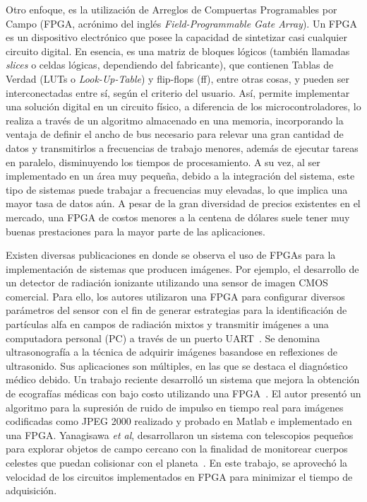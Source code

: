 Otro enfoque, es la utilización de Arreglos de Compuertas Programables por Campo (FPGA, acrónimo del inglés {\it Field-Programmable Gate Array}). Un FPGA es un dispositivo electrónico que posee la capacidad de sintetizar casi cualquier circuito digital. En esencia, es una matriz de bloques lógicos (también llamadas {\it slices} o celdas lógicas, dependiendo del fabricante), que contienen Tablas de Verdad (LUTs o {\it Look-Up-Table}) y flip-flops (ff), entre otras cosas, y pueden ser interconectadas entre sí, según el criterio del usuario. Así, permite implementar una solución digital en un circuito físico, a diferencia de los microcontroladores, lo realiza a través de un algoritmo almacenado en una memoria, incorporando la ventaja de definir el ancho de bus necesario para relevar una gran cantidad de datos y transmitirlos a frecuencias de trabajo menores, además de ejecutar tareas en paralelo, disminuyendo los tiempos de procesamiento. A su vez, al ser implementado en un área muy pequeña, debido a la integración del sistema, este tipo de sistemas puede trabajar a frecuencias muy elevadas, lo que implica una mayor tasa de datos aún. A pesar de la gran diversidad de precios existentes en el mercado, una FPGA de costos menores a la centena de dólares suele tener muy buenas prestaciones para la mayor parte de las aplicaciones.%

Existen diversas publicaciones en donde se observa el uso de FPGAs para la implementación de sistemas que producen imágenes. Por ejemplo, el desarrollo de un detector de radiación ionizante utilizando una sensor de imagen CMOS comercial. Para ello, los autores utilizaron una FPGA para configurar diversos parámetros del sensor con el fin de generar estrategias para la identificación de partículas alfa en campos de radiación mixtos y transmitir imágenes a una computadora personal (PC) a través de un puerto UART~\cite{Perez2017}. Se denomina ultrasonografía a la técnica de adquirir imágenes basandose en reflexiones de ultrasonido. Sus aplicaciones son múltiples, en las que se destaca el diagnóstico médico debido. Un trabajo reciente desarrolló un sistema que mejora la obtención de ecografías médicas con bajo costo utilizando una FPGA~\cite{biswas2018embedded}. El autor presentó un algoritmo para la supresión de ruido de impulso en tiempo real para imágenes codificadas como JPEG 2000 realizado y probado en Matlab e implementado en una FPGA. Yanagisawa {\it et al}, desarrollaron un sistema con telescopios pequeños para explorar objetos de campo cercano con la finalidad de monitorear cuerpos celestes que puedan colisionar con el planeta~\cite{Yanagisawa2018}. En este trabajo, se aprovechó la velocidad de los circuitos implementados en FPGA para minimizar el tiempo de adquisición.%

